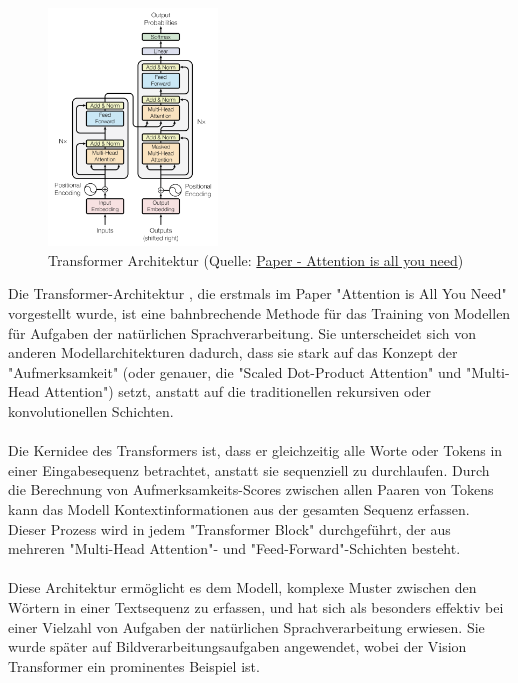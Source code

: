 \documentclass{article}
\begin{document}
\newpage
\begin{figure}[!h]
    \centering
    \includegraphics[width=0.4\textwidth]{images/model_architecture/transformer.png}
    \caption{\label{fig:resnet_50_architecture}Transformer Architektur (Quelle: \href{https://arxiv.org/pdf/1706.03762.pdf}{Paper - Attention is all you need})}
\end{figure}


Die Transformer-Architektur \cite{vaswani_attention_2017}, die erstmals im Paper "Attention is All You Need" vorgestellt wurde, ist eine bahnbrechende Methode für das Training von Modellen für Aufgaben der natürlichen Sprachverarbeitung. Sie unterscheidet sich von anderen Modellarchitekturen dadurch, dass sie stark auf das Konzept der "Aufmerksamkeit" (oder genauer, die "Scaled Dot-Product Attention" und "Multi-Head Attention") setzt, anstatt auf die traditionellen rekursiven oder konvolutionellen Schichten.\\\\
Die Kernidee des Transformers ist, dass er gleichzeitig alle Worte oder Tokens in einer Eingabesequenz betrachtet, anstatt sie sequenziell zu durchlaufen. Durch die Berechnung von Aufmerksamkeits-Scores zwischen allen Paaren von Tokens kann das Modell Kontextinformationen aus der gesamten Sequenz erfassen. Dieser Prozess wird in jedem "Transformer Block" durchgeführt, der aus mehreren "Multi-Head Attention"- und "Feed-Forward"-Schichten besteht.\\\\
Diese Architektur ermöglicht es dem Modell, komplexe Muster zwischen den Wörtern in einer Textsequenz zu erfassen, und hat sich als besonders effektiv bei einer Vielzahl von Aufgaben der natürlichen Sprachverarbeitung erwiesen. Sie wurde später auf Bildverarbeitungsaufgaben angewendet, wobei der Vision Transformer ein prominentes Beispiel ist. 
\end{document}
